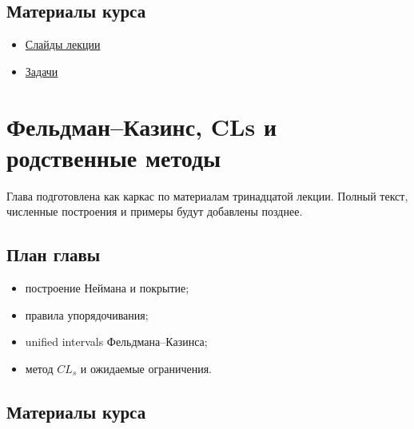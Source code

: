 \documentclass[
  russian,
  12pt,
  a4paper,
  a4paper,
  openany]{scrbook}
\providecommand{\tightlist}{%
  \setlength{\itemsep}{0pt}\setlength{\parskip}{0pt}}
\begin{document}
\section{Материалы
курса}\label{ux43cux430ux442ux435ux440ux438ux430ux43bux44b-ux43aux443ux440ux441ux430-9}

\begin{itemize}
\tightlist
\item
  \href{https://neutrinohit.github.io/statistical-analysis-course/ru/slides/11_goodness_of_fit_and_significance.html}{Слайды
  лекции}
\item
  \href{https://neutrinohit.github.io/statistical-analysis-course/ru/slides/exercises/11_goodness_of_fit_and_significance_exercises.html}{Задачи}
\end{itemize}

\chapter{Фельдман--Казинс, CLs и родственные
методы}\label{ux444ux435ux43bux44cux434ux43cux430ux43dux43aux430ux437ux438ux43dux441-cls-ux438-ux440ux43eux434ux441ux442ux432ux435ux43dux43dux44bux435-ux43cux435ux442ux43eux434ux44b}

\begin{bookchapteropening}

Глава подготовлена как каркас по материалам тринадцатой лекции. Полный
текст, численные построения и примеры будут добавлены позднее.

\end{bookchapteropening}

\section{План
главы}\label{ux43fux43bux430ux43d-ux433ux43bux430ux432ux44b-11}

\begin{itemize}
\tightlist
\item
  построение Неймана и покрытие;
\item
  правила упорядочивания;
\item
  unified intervals Фельдмана--Казинса;
\item
  метод \(CL_s\) и ожидаемые ограничения.
\end{itemize}

\section{Материалы
курса}\label{ux43cux430ux442ux435ux440ux438ux430ux43bux44b-ux43aux443ux440ux441ux430-10}
\end{document}
